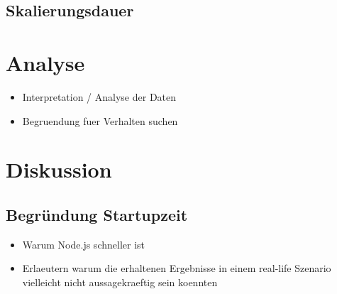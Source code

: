 



\subsection{Skalierungsdauer}




\section{Analyse}
\begin{itemize}
  \item Interpretation / Analyse der Daten
  \item Begruendung fuer Verhalten suchen
\end{itemize}

\section{Diskussion}

\subsection{Begr\"undung Startupzeit}
\begin{itemize}
  \item Warum Node.js schneller ist
\end{itemize}

\begin{itemize}
  \item Erlaeutern warum die erhaltenen Ergebnisse in einem real-life Szenario vielleicht nicht aussagekraeftig sein koennten
\end{itemize}
